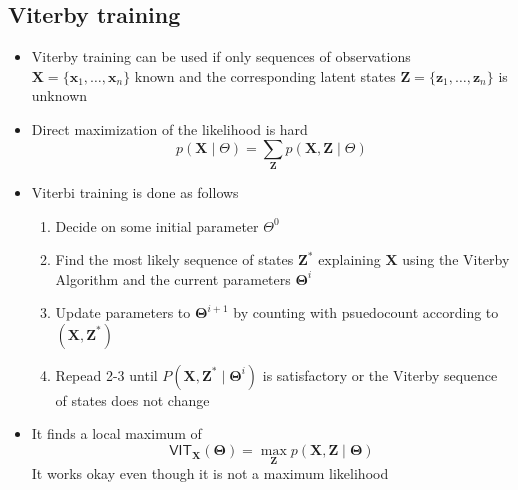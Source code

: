 \documentclass[a4, english]{article}
\begin{document}
\subsection{Viterby training}
\begin{itemize}
	\item Viterby training can be used if only sequences of observations $\pmb X = \{\pmb x_1, \dots, \pmb x_n\}$ known and the corresponding latent states $\pmb Z = \{\pmb z_1, \dots, \pmb z_n\}$ is unknown  
  \item Direct maximization of the likelihood is hard
  \begin{equation*}
    p(\pmb X \mid \Theta) = \sum_{\pmb Z} p(\pmb X, \pmb Z \mid \Theta)
  \end{equation*}

  \item Viterbi training is done as follows  
  \begin{enumerate}
  	\item Decide on some initial parameter $\Theta ^0$  
    \item Find the most likely sequence of states $\pmb Z^*$ explaining $\pmb X$ using the Viterby Algorithm and the current parameters $\pmb \Theta ^i$  
    \item Update parameters to $\pmb \Theta^{i+1}$ by counting with psuedocount according to $(\pmb X, \pmb Z^*)$ 
    \item Repead 2-3 until $P(\pmb X, \pmb Z^* \mid \pmb \Theta^i)$ is satisfactory or the Viterby sequence of states does not change
  \end{enumerate}
  \item It finds a local maximum of
  \begin{equation*}
    \mathsf{VIT}_{\pmb X}(\pmb \Theta) = \max_{\pmb Z} p(\pmb X, \pmb Z \mid \pmb \Theta)
  \end{equation*}
  It works okay even though it is not a maximum likelihood
\end{itemize}  
\end{document}
